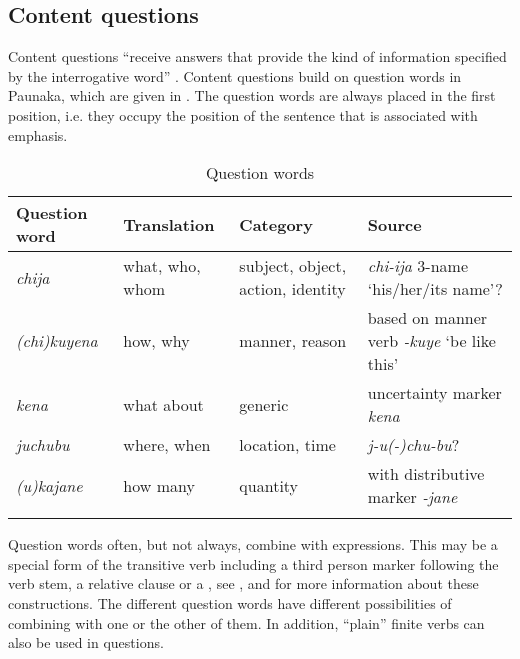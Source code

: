 \subsection{Content questions}\label{sec:ContentQuestions}

Content questions “receive answers that provide the kind of information specified by the interrogative word” \citep[291]{Koenig2007}. Content questions build on question words in Paunaka, which are given in . The question words are always placed in the first position, i.e. they occupy the position of the sentence that is associated with emphasis.

\begin{table}
\caption{Question words}
\begin{tabularx}{\textwidth}{l>{\raggedright\arraybackslash}p{2.2cm}QQ}
\lsptoprule
Question word & Translation & Category & Source\\
\midrule
\textit{chija} & what, who, whom & subject, object, action, identity & \textit{chi-ija} 3-name ‘his/her/its name’?\\
\textit{(chi)kuyena} & how, why & manner, reason & based on manner verb \textit{-kuye} ‘be like this’\\
\textit{kena} & what about & generic & uncertainty marker \textit{kena}\\
\textit{juchubu} & where, when & location, time & \textit{j-u(-)chu-bu}? \\
\textit{(u)kajane} & how many & quantity & with distributive marker \textit{-jane} \\
\lspbottomrule
 \end{tabularx}
\label{table:QuestionWords}
\end{table}

Question words often, but not always, combine with  expressions. This may be a special form of the transitive verb including a third person marker following the verb stem, a relative clause or a , see ,  and  for more information about these constructions. The different question words have different possibilities of combining with one or the other of them. In addition, “plain” finite verbs can also be used in questions.

